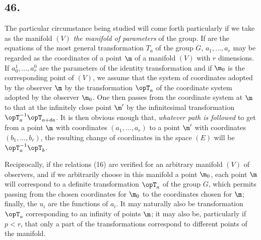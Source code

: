 \subsection*{46.}

The particular circumstance being studied will come forth particularly if we take as the manifold $(V)$ \textit{the manifold of parameters} of the group. If
are the  equations of the most general transformation $T_a$ of the group $G$, $a_1, \dots, a_r$ may be regarded as the coordinates of a point $\m$ of a manifold $(V)$ with $r$ dimensions. If $a_0^1, \dots, a_r^0$ are the parameters of the identity transformation and if $\m_0$ is the corresponding point of $(V)$, we assume that the system of coordinates adopted by the observer $\m$  by the transformation $\opT_a$ of the coordinate system adopted by the observer $\m_0$. One then passes from the coordinate system at $\m$ to that at the infinitely close point $\m'$ by the infinitesimal transformation $\opT_a^{-1}\opT_{a+da}$. It is then obvious enough that, \textit{whatever path is followed} to get from a point $\m$ with coordinates $(a_1, \dots, a_r)$ to a point $\m'$ with coordinates $(b_1, \dots, b_r)$, the resulting change of coordinates in the space $(E)$ will be $\opT_a^{-1}\opT_b$.

Reciprocally, if the relations (16) are verified for an arbitrary manifold $(V)$ of observers, and if we arbitrarily choose in this manifold a point $\m_0$, each point $\m$ will correspond to a definite transformation $\opT_a$ of the group $G$, which permits passing from the chosen coordinates for $\m_0$ to the coordinates chosen for $\m$; finally, the $u_i$ are the  functions of $a_i$. It may naturally also be  transformation $\opT_a$ corresponding to an infinity of points $\m$; it may also be, particularly if $p<r$, that only a part of the transformations correspond to different points of the manifold.
